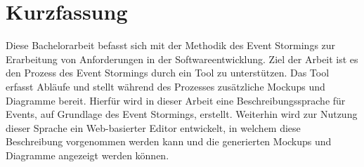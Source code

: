 \chapter*{Kurzfassung}

Diese Bachelorarbeit befasst sich mit der Methodik des Event Stormings zur Erarbeitung von Anforderungen in der Softwareentwicklung.
Ziel der Arbeit ist es den Prozess des Event Stormings durch ein Tool zu unterstützen.
Das Tool erfasst Abläufe und stellt während des Prozesses zusätzliche Mockups und Diagramme bereit.
Hierfür wird in dieser Arbeit eine Beschreibungssprache für Events, auf Grundlage des Event Stormings, erstellt.
Weiterhin wird zur Nutzung dieser Sprache ein Web-basierter Editor entwickelt, in welchem diese Beschreibung vorgenommen werden kann und
die generierten Mockups und Diagramme angezeigt werden können.
